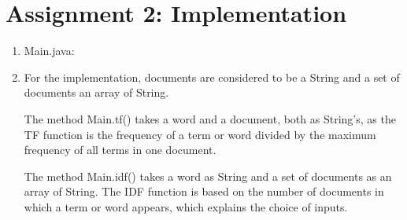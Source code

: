 \documentclass{article}
\begin{document}
\section{Assignment 2: Implementation}
\renewcommand{\labelenumi}{\alph{enumi}.}
\renewcommand{\labelenumii}{(\alph{enumii})}
\begin{enumerate}
\item{Main.java: \\
\lstset{breaklines=true}

}
\item{For the implementation, documents are considered to be a String and a set of documents an array of String.

The method Main.tf() takes a word and a document, both as String's, as the TF function is the frequency of a term or word divided by the maximum frequency of all terms in one document.

The method Main.idf() takes a word as String and a set of documents as an array of String. The IDF function is based on the number of documents in which a term or word appears, which explains the choice of inputs.}
\end{enumerate}
\end{document}
